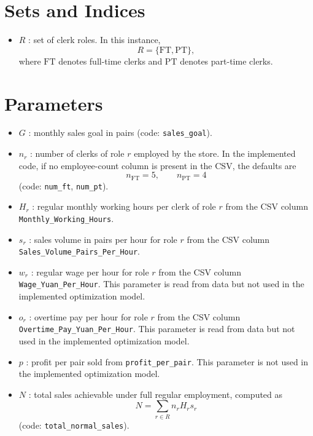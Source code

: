 \section*{Sets and Indices}

\begin{itemize}
    \item $R$ : set of clerk roles. In this instance,
    \[
    R=\{\mathrm{FT},\mathrm{PT}\},
    \]
    where $\mathrm{FT}$ denotes full-time clerks and $\mathrm{PT}$ denotes part-time clerks.
\end{itemize}

\section*{Parameters}

\begin{itemize}
    \item $G$ : monthly sales goal in pairs (code: \texttt{sales\_goal}).
    \item $n_r$ : number of clerks of role $r$ employed by the store. In the implemented code, if no employee-count column is present in the CSV, the defaults are
    \[
    n_{\mathrm{FT}}=5,\qquad n_{\mathrm{PT}}=4
    \]
    (code: \texttt{num\_ft}, \texttt{num\_pt}).
    \item $H_r$ : regular monthly working hours per clerk of role $r$ from the CSV column \texttt{Monthly\_Working\_Hours}.
    \item $s_r$ : sales volume in pairs per hour for role $r$ from the CSV column \texttt{Sales\_Volume\_Pairs\_Per\_Hour}.
    \item $w_r$ : regular wage per hour for role $r$ from the CSV column \texttt{Wage\_Yuan\_Per\_Hour}. This parameter is read from data but not used in the implemented optimization model.
    \item $o_r$ : overtime pay per hour for role $r$ from the CSV column \texttt{Overtime\_Pay\_Yuan\_Per\_Hour}. This parameter is read from data but not used in the implemented optimization model.
    \item $p$ : profit per pair sold from \texttt{profit\_per\_pair}. This parameter is not used in the implemented optimization model.
    \item $N$ : total sales achievable under full regular employment, computed as
    \[
    N=\sum_{r\in R} n_r H_r s_r
    \]
    (code: \texttt{total\_normal\_sales}).
\end{itemize}

